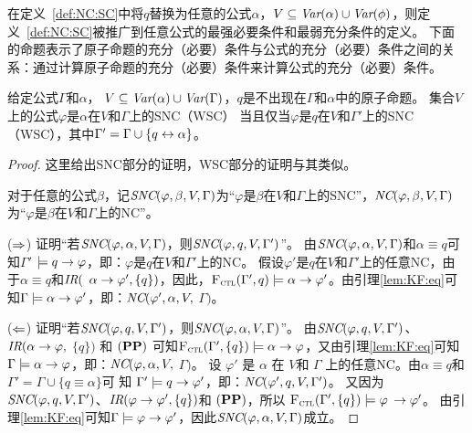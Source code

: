 在定义~\ref{def:NC:SC}中将$q$替换为任意的公式$\alpha$，$V\subseteq \textit{Var}(\alpha) \cup \textit{Var}(\phi)$，则定义~\ref{def:NC:SC}被推广到任意公式的最强必要条件和最弱充分条件的定义。
下面的命题表示了原子命题的充分（必要）条件与公式的充分（必要）条件之间的关系：通过计算原子命题的充分（必要）条件来计算公式的充分（必要）条件。



\begin{proposition}\label{formulaNS_to_p}
	给定公式$\Gamma$和$\alpha$， $V \subseteq \textit{Var}(\alpha) \cup \textit{Var}(\Gamma)$，$q$是不出现在$\Gamma$和$\alpha$中的原子命题。
	集合$V$上的公式$\varphi$是$\alpha$在$V$和$\Gamma$上的SNC（WSC） 当且仅当$\varphi$是$q$在$V$和$\Gamma'$上的SNC（WSC），其中$\Gamma' = \Gamma \cup \{q \leftrightarrow \alpha\}$。
\end{proposition}
\begin{proof}
	这里给出SNC部分的证明，WSC部分的证明与其类似。
	
	对于任意的公式$\beta$，记$\emph{SNC}(\varphi,\beta,V,\Gamma)$为“$\varphi$是$\beta$在$V$和$\Gamma$上的SNC”，$\emph{NC}(\varphi,\beta,V,\Gamma)$为“$\varphi$是$\beta$在$V$和$\Gamma$上的NC”。
	
	
	($\Rightarrow$) 证明“若$\emph{SNC}(\varphi,\alpha,V,\Gamma)$，则$\emph{SNC}(\varphi,q,V,\Gamma')$”。
	由$\emph{SNC}(\varphi,\alpha,V,\Gamma)$和$\alpha\equiv q$可知$\Gamma'$ $\models q\rightarrow \varphi$，即：$\varphi$是$q$在$V$和$\Gamma'$上的NC。
	假设$\varphi'$是$q$在$V$和$\Gamma'$上的任意NC，由于$\alpha\equiv q$和$\emph{IR}($ $\alpha \rightarrow \varphi', \{q\})$，因此，${\textsc{F}_{\textsc{ctl}}}(\Gamma',q)\models \alpha \rightarrow \varphi'$。由引理\ref{lem:KF:eq}可知$\Gamma \models \alpha \rightarrow \varphi'$，即：$\emph{NC}(\varphi',\alpha,V,$ $\Gamma)$。
	
	
	($\Leftarrow$) 证明“若$\emph{SNC}(\varphi,q,V,\Gamma')$，则$\emph{SNC}(\varphi,\alpha,V,\Gamma)$”。
	由$\emph{SNC}(\varphi,q,V,\Gamma')$、$\emph{IR}(\alpha \rightarrow \varphi,$ $\{q\})$ 和 $(\textbf{PP})$ 可知${\textsc{F}_{\textsc{ctl}}}(\Gamma', \{q\})\models \alpha \rightarrow \varphi$，又由引理\ref{lem:KF:eq}可知$\Gamma \models \alpha \rightarrow \varphi$，即：$\emph{NC}(\varphi,\alpha,V,$ $\Gamma)$。
	设 $\varphi'$ 是 $\alpha$ 在 $V$和 $\Gamma$ 上的任意NC。由$\alpha\equiv q$和 $\Gamma'=\Gamma \cup \{q\equiv \alpha\}$可 知 $\Gamma' \models q \rightarrow \varphi'$，即：$\emph{NC}(\varphi',q,V,\Gamma')$。
	又因为$\emph{SNC}(\varphi,q,V,\Gamma')$、$\emph{IR}(\varphi \rightarrow \varphi', \{q\})$和 $(\textbf{PP})$，所以 ${\textsc{F}_{\textsc{ctl}}}(\Gamma', \{q\})\models \varphi$  $\rightarrow \varphi'$。
	由引理\ref{lem:KF:eq}可知$\Gamma \models \varphi \rightarrow \varphi'$，因此$\emph{SNC}(\varphi,\alpha,V, \Gamma)$成立。
\end{proof}


